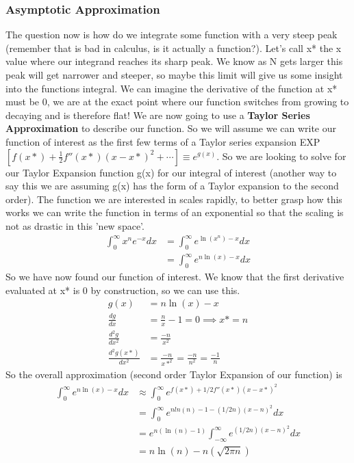 \documentclass{article}
\begin{document}
\subsubsection*{Asymptotic Approximation}
The question now is how do we integrate some function with a very steep peak (remember that is bad in calculus, is it actually a function?). 
Let's call x* the x value where our integrand reaches its sharp peak. 
We know as N gets larger this peak will get narrower and steeper, so maybe this limit will give us some insight into the functions integral. 
We can imagine the derivative of the function at x* must be 0, we are at the exact point where our function switches from growing to decaying and is therefore flat!
We are now going to use a \textbf{Taylor Series Approximation} to describe our function. 
So we will assume we can write our function of interest as the first few terms of a Taylor series expansion EXP$\left[ f(x*) + \frac{1}{2}f''(x*)(x-x*)^2 +\cdots \right ] \equiv e^{g(x)}$. 
So we are looking to solve for our Taylor Expansion function g(x) for our integral of interest (another way to say this we are assuming g(x) has the form of a Taylor expansion to the second order). 
The function we are interested in scales rapidly, to better grasp how this works we can write the function in terms of an exponential so that the scaling is not as drastic in this 'new space'.
\begin{equation}
\begin{split}
    \int_0^\infty x^{n}e^{-x}dx &= \int_0^\infty e^{\ln(x^n)-x}dx \\
    &= \int_0^\infty e^{n\ln(x)-x}dx
    \end{split}
\end{equation}
So we have now found our function of interest. 
We know that the first derivative evaluated at x* is 0 by construction, so we can use this. 
\begin{equation}
\begin{split}
g(x) &= n\ln(x) -x\\
\frac{dg}{dx} &= \frac{n}{x}-1 = 0 \implies x* = n \\
\frac{d^2g}{dx^2} &= \frac{-n}{x^2}  \\
\frac{d^2g(x*)}{dx^2} &= \frac{-n}{x*^2} = \frac{-n}{n^2} = \frac{-1}{n}
\end{split}
\end{equation}
So the overall approximation (second order Taylor Expansion of our function) is
\begin{equation}
\begin{split}
\int_0^\infty e^{n\ln(x)-x}dx &\approx  \int_0^\infty e^{f(x*) + 1/2f''(x*)(x-x*)^2} \\
&= \int_0^\infty e^{nln(n)-1 - (1/2n)(x-n)^2}dx \\
&= e^{n(\ln(n) -1)} \int_{-\infty}^\infty e^{(1/2n)(x-n)^2}dx \\
&= n\ln(n)-n(\sqrt{2\pi n})
\end{split}
\end{equation}
\end{document}
